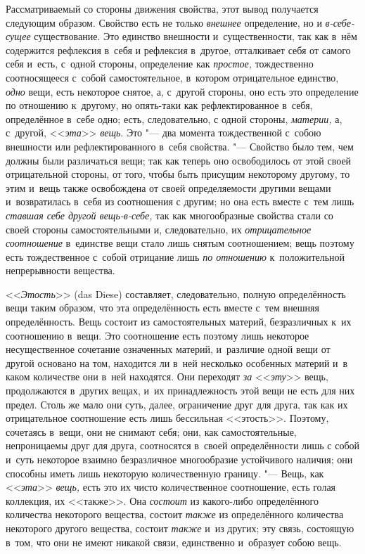 Рассматриваемый со стороны движения свойства, этот вывод получается
следующим образом. Свойство есть не только {\em внешнее} определение, но и
{\em в-себе-сущее} существование. Это единство
внешности и~существенности, так как в~нём содержится рефлексия в~себя и
рефлексия в~другое, отталкивает себя от самого себя и~есть, с~одной
стороны, определение как {\em простое,} тождественно
соотносящееся с~собой самостоятельное, в~котором отрицательное единство,
{\em одно} вещи, есть некоторое снятое, а, с~другой
стороны, оно есть это определение по отношению к~другому, но опять-таки как
рефлектированное в~себя, определённое в~себе одно; есть, следовательно, с
одной стороны, {\em материи,} а, с~другой,
<<{\em эта}>> {\em вещь}. Это "--- два
момента тождественной с~собою внешности или рефлектированного в~себя
свойства. "--- Свойство было тем, чем должны были различаться вещи; так как
теперь оно освободилось от этой своей отрицательной стороны, от того, чтобы
быть присущим некоторому другому, то этим и~вещь также освобождена от своей
определяемости другими вещами и~возвратилась в~себя из соотношения с
другим; но она есть вместе с~тем лишь {\em ставшая себе
другой вещь-в-себе,} так как многообразные свойства стали со своей стороны
самостоятельными и, следовательно, их
{\em отрицательное соотношение} в~единстве вещи стало
лишь снятым соотношением; вещь поэтому есть тождественное с~собой отрицание
лишь {\em по отношению} к~положительной непрерывности вещества.

<<{\em Этость}>> (das Diese) составляет, следовательно,
полную определённость вещи таким образом, что эта определённость есть
вместе с~тем внешняя определённость. Вещь состоит из самостоятельных
материй, безразличных к~их соотношению в~вещи. Это соотношение есть поэтому
лишь некоторое несущественное сочетание означенных материй, и~различие
одной вещи от другой основано на том, находится ли в~ней несколько
особенных материй и~в каком количестве они в~ней находятся. Они переходят
{\em за} <<{\em эту}>> вещь,
продолжаются в~других вещах, и~их принадлежность этой вещи не есть для них
предел. Столь же мало они суть, далее, ограничение друг для друга, так как
их отрицательное соотношение есть лишь бессильная <<этость>>. Поэтому,
сочетаясь в~вещи, они не снимают себя; они, как самостоятельные,
непроницаемы друг для друга, соотносятся в~своей определённости лишь с
собой и~суть некоторое взаимно безразличное многообразие устойчивого
наличия; они способны иметь лишь некоторую количественную границу. "--- Вещь,
как <<{\em эта}>> {\em вещь,} есть
это их чисто количественное соотношение, есть голая коллекция, их <<также>>.
Она {\em состоит} из какого-либо определённого
количества некоторого вещества, состоит {\em также} из
определённого количества некоторого другого вещества, состоит
{\em также} и~из других; эту связь, состоящую в~том,
что они не имеют никакой связи, единственно и~образует собою вещь.


